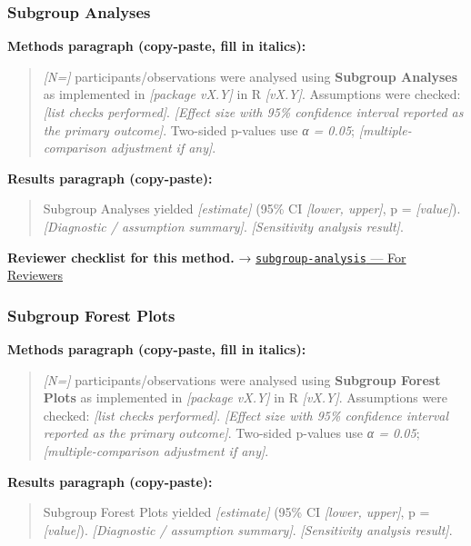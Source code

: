 \documentclass[
]{article}
\begin{document}
\subsubsection{Subgroup Analyses}\label{subgroup-analyses}

\textbf{Methods paragraph (copy-paste, fill in italics):}

\begin{quote}
\emph{{[}N={]}} participants/observations were analysed using
\textbf{Subgroup Analyses} as implemented in \emph{{[}package vX.Y{]}}
in R \emph{{[}vX.Y{]}}. Assumptions were checked: \emph{{[}list checks
performed{]}}. \emph{{[}Effect size with 95\% confidence interval
reported as the primary outcome{]}}. Two-sided p-values use \emph{α =
0.05}; \emph{{[}multiple-comparison adjustment if any{]}}.
\end{quote}

\textbf{Results paragraph (copy-paste):}

\begin{quote}
Subgroup Analyses yielded \emph{{[}estimate{]}} (95\% CI \emph{{[}lower,
upper{]}}, p = \emph{{[}value{]}}). \emph{{[}Diagnostic / assumption
summary{]}}. \emph{{[}Sensitivity analysis result{]}}.
\end{quote}

\textbf{Reviewer checklist for this method.} →
\href{../chapters/14-clinical/subgroup-analysis.Rmd\#for-reviewers}{\texttt{subgroup-analysis}
--- For Reviewers}

\subsubsection{Subgroup Forest Plots}\label{subgroup-forest-plots}

\textbf{Methods paragraph (copy-paste, fill in italics):}

\begin{quote}
\emph{{[}N={]}} participants/observations were analysed using
\textbf{Subgroup Forest Plots} as implemented in \emph{{[}package
vX.Y{]}} in R \emph{{[}vX.Y{]}}. Assumptions were checked: \emph{{[}list
checks performed{]}}. \emph{{[}Effect size with 95\% confidence interval
reported as the primary outcome{]}}. Two-sided p-values use \emph{α =
0.05}; \emph{{[}multiple-comparison adjustment if any{]}}.
\end{quote}

\textbf{Results paragraph (copy-paste):}

\begin{quote}
Subgroup Forest Plots yielded \emph{{[}estimate{]}} (95\% CI
\emph{{[}lower, upper{]}}, p = \emph{{[}value{]}}). \emph{{[}Diagnostic
/ assumption summary{]}}. \emph{{[}Sensitivity analysis result{]}}.
\end{quote}
\end{document}
